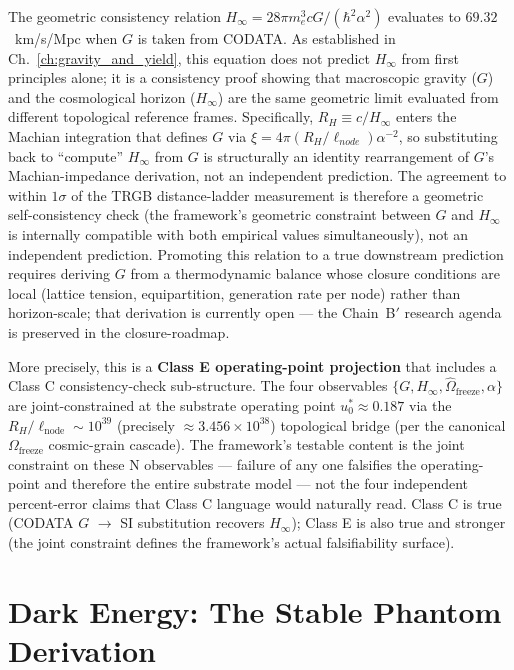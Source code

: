 \noindent The geometric consistency relation $H_\infty = 28\pi m_e^3 cG/(\hbar^2\alpha^2)$ evaluates to $69.32$~km/s/Mpc when $G$ is taken from CODATA. As established in Ch.~\ref{ch:gravity_and_yield}, this equation does not predict $H_\infty$ from first principles alone; it is a consistency proof showing that macroscopic gravity ($G$) and the cosmological horizon ($H_\infty$) are the same geometric limit evaluated from different topological reference frames. Specifically, $R_H \equiv c/H_\infty$ enters the Machian integration that defines $G$ via $\xi = 4\pi(R_H/\ell_{node})\alpha^{-2}$, so substituting back to ``compute'' $H_\infty$ from $G$ is structurally an identity rearrangement of $G$'s Machian-impedance derivation, not an independent prediction. The agreement to within $1\sigma$ of the TRGB distance-ladder measurement is therefore a geometric self-consistency check (the framework's geometric constraint between $G$ and $H_\infty$ is internally compatible with both empirical values simultaneously), not an independent prediction. Promoting this relation to a true downstream prediction requires deriving $G$ from a thermodynamic balance whose closure conditions are local (lattice tension, equipartition, generation rate per node) rather than horizon-scale; that derivation is currently open --- the Chain~B$'$ research agenda is preserved in the closure-roadmap.

\medskip
\noindent More precisely, this is a \textbf{Class E operating-point projection} that includes a Class C consistency-check sub-structure. The four observables $\{G, H_\infty, \hat{\Omega}_{\text{freeze}}, \alpha\}$ are joint-constrained at the substrate operating point $u_0^* \approx 0.187$ via the $R_H/\ell_{\text{node}} \sim 10^{39}$ (precisely $\approx 3.456\times10^{38}$) topological bridge (per the canonical $\Omega_\text{freeze}$ cosmic-grain cascade). The framework's testable content is the joint constraint on these N observables --- failure of any one falsifies the operating-point and therefore the entire substrate model --- not the four independent percent-error claims that Class C language would naturally read. Class C is true (CODATA $G$ $\to$ SI substitution recovers $H_\infty$); Class E is also true and stronger (the joint constraint defines the framework's actual falsifiability surface).

\section{Dark Energy: The Stable Phantom Derivation}

